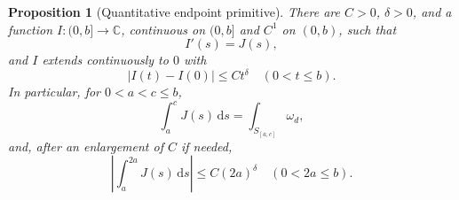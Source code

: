 \documentclass[11pt]{article}
\numberwithin{equation}{section}
\newtheorem{proposition}[theorem]{Proposition}
\theoremstyle{definition}
\theoremstyle{remark}
\newcommand{\C}{\mathbb C}
\newcommand{\dd}{\mathrm d}
\newcommand{\omegaD}{\omega_d}
\begin{document}
\begin{proposition}[Quantitative endpoint primitive]\label{prop:primitive}
There are $C>0$, $\delta>0$, and a function
$I:(0,b]\to\C$, continuous on $(0,b]$ and $C^1$ on $(0,b)$, such that
\begin{equation}\label{eq:primitive-derivative}
 I'(s)=J(s),
\end{equation}
and $I$ extends continuously to $0$ with
\begin{equation}\label{eq:primitive-endpoint}
 |I(t)-I(0)|\le Ct^\delta\quad(0<t\le b).
\end{equation}
In particular, for $0<a<c\le b$,
\begin{equation}\label{eq:sweep-integral}
 \int_a^cJ(s)\,\dd s=\int_{S_{[a,c]}}\omegaD,
\end{equation}
and, after an enlargement of $C$ if needed,
\begin{equation}\label{eq:dyadic-primitive}
 \left|\int_a^{2a}J(s)\,\dd s\right|\le C(2a)^\delta
 \quad(0<2a\le b).
\end{equation}
\end{proposition}
\end{document}
